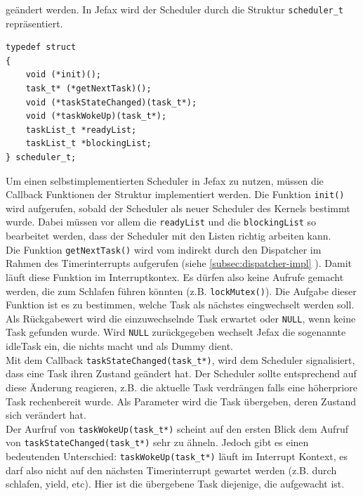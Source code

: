 \documentclass[fontsize=12pt, toc=bibliography, notitlepage]{scrreprt}
\newcommand{\refnn}[1]{\ref{#1} \nameref{#1}}
\begin{document}
geändert werden. In Jefax wird der Scheduler durch die Struktur \lstinline$scheduler_t$ repräsentiert.

\begin{lstlisting}[title=scheduler.h]
typedef struct
{
	void (*init)();
	task_t* (*getNextTask)();
	void (*taskStateChanged)(task_t*);
	void (*taskWokeUp)(task_t*);
	taskList_t *readyList;
	taskList_t *blockingList;
} scheduler_t;
\end{lstlisting}

Um einen selbstimplementierten Scheduler in Jefax zu nutzen, müssen die Callback Funktionen der Struktur implementiert werden. Die Funktion \lstinline$init()$ wird aufgerufen, sobald der Scheduler als neuer Scheduler des Kernels bestimmt wurde. Dabei müssen vor allem die \lstinline$readyList$ und die \lstinline$blockingList$ so bearbeitet werden, dass der Scheduler mit den Listen richtig arbeiten kann.\\

Die Funktion \lstinline$getNextTask()$ wird vom indirekt durch den Dispatcher im Rahmen des Timerinterrupts aufgerufen (siehe \refnn{subsec:dispatcher-impl}). Damit läuft diese Funktion im Interruptkontex. Es dürfen also keine Aufrufe gemacht werden, die zum Schlafen führen könnten (z.B. \lstinline$lockMutex()$). Die Aufgabe dieser Funktion ist es zu bestimmen, welche Task als nächstes eingwechselt werden soll. Als Rückgabewert wird die einzuwechselnde Task erwartet oder \lstinline$NULL$, wenn keine Task gefunden wurde. Wird \lstinline$NULL$ zurückgegeben wechselt Jefax die sogenannte idleTask ein, die nichts macht und als Dummy dient.\\

Mit dem Callback \lstinline$taskStateChanged(task_t*)$, wird dem Scheduler signalisiert, dass eine Task ihren Zustand geändert hat. Der Scheduler sollte entsprechend auf diese Änderung reagieren, z.B. die aktuelle Task verdrängen falls eine höherpriore Task rechenbereit wurde. Als Parameter wird die Task übergeben, deren Zustand sich verändert hat.\\

Der Aurfruf von \lstinline$taskWokeUp(task_t*)$ scheint auf den ersten Blick dem Aufruf von \lstinline$taskStateChanged(task_t*)$ sehr zu ähneln. Jedoch gibt es einen bedeutenden Unterschied: \lstinline$taskWokeUp(task_t*)$ läuft im Interrupt Kontext, es darf also nicht auf den nächsten Timerinterrupt gewartet werden (z.B. durch schlafen, yield, etc). Hier ist die übergebene Task diejenige, die aufgewacht ist.\\
\end{document}
